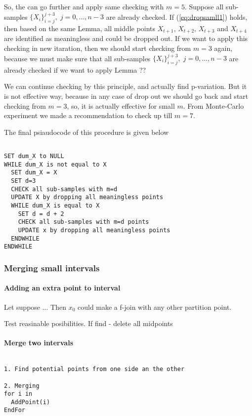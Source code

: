 \documentclass[12pt, a4paper]{article}
\numberwithin{equation}{section}
\begin{document}
So, the can go further and apply same checking with
$m=5$. Suppose all sub-samples
 $\{X_{i}\}_{i=j}^{j+3},\;j=0,...,n-3$ are already 
 checked.
 If (\ref{eq:dropsamll1}) holds, then based on
 the same Lemma, all middle points
$X_{t+1}$, $X_{t+2}$, $X_{t+3}$  and $X_{t+4}$ are  
identified as meaningless and could be dropped out.
If we want to apply this checking in new itaration,
then we should start checking from $m=3$ again, because
we must make sure that all sub-samples
 $\{X_{i}\}_{i=j}^{j+3},\;j=0,...,n-3$ are already 
 checked if we want to apply Lemma ??

We can continue checking by this principle, and actually find 
p-variation. But it is not effective way, because
in any case of drop out we should go back and start checking
from $m=3$, so, it is actually effective for small $m$. From Monte-Carlo experiment we made
a recommendation to check up till $m=7$.

The final psiaudocode of this procedure is given below
\begin{lstlisting}

SET dum_X to NULL
WHILE dum_X is not equal to X
  SET dum_X	= X
  SET d=3
  CHECK all sub-samples with m=d 
  UPDATE X by dropping all meaningless points
  WHILE dum_X is equal to X	
    SET d = d + 2
    CHECK all sub-samples with m=d points
    UPDATE x by dropping all meaningless points
  ENDWHILE  
ENDWHILE

\end{lstlisting}

\subsubsection{Merging small intervals}

\paragraph{Adding an extra point to interval}

Let suppose ...
Then $x_0$ could make a f-join with any other partition point.

Test reasinable posibilities. 
If find - delete all midpoints

\paragraph{Merge two intervals}


\begin{lstlisting}

1. Find potential points from one side an the other

2. Merging
for i in 
  AddPoint(i)
EndFor

\end{lstlisting}
\end{document}

